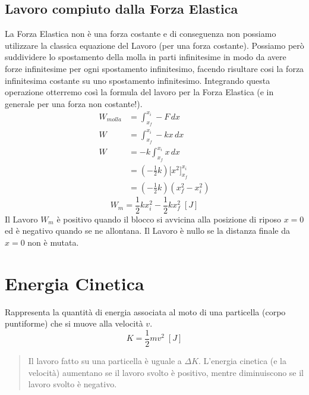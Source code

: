        \subsection{Lavoro compiuto dalla Forza Elastica} La Forza Elastica non 
        è una forza costante e di conseguenza non possiamo utilizzare la 
        classica equazione del Lavoro (per una forza costante). Possiamo però 
        suddividere lo spostamento della molla in parti infinitesime in modo da
        avere forze infinitesime per ogni spostamento infinitesimo, facendo 
        risultare cosi la forza infinitesima costante su uno spostamento 
        infinitesimo. Integrando questa operazione otterremo così la formula 
        del lavoro per la Forza Elastica 
        (e in generale per una forza non costante!).
        \begin{align*}
            W_{molla} &= \int_{x_f}^{x_i} -F \,dx \\
            W &= \int_{x_f}^{x_i} -kx \,dx \\
            W &= -k \int_{x_f}^{x_i} x \,dx \\
            &= (-\frac{1}{2}k)\bigg[x^2 \bigg]_{x_f}^{x_i} \\
            &= (-\frac{1}{2}k) (x^2_f - x^2_i)
        \end{align*}
        \begin{equation}
            W_m = \frac{1}{2}kx^2_i - \frac{1}{2}kx^2_f \;[J]
        \end{equation}
        Il Lavoro $W_m$ è positivo quando il blocco si avvicina alla posizione 
        di riposo $x=0$ ed è negativo quando se ne allontana. Il Lavoro è nullo
        se la distanza finale da $x=0$ non è mutata.

    \section{Energia Cinetica} Rappresenta la quantità di energia associata al 
        moto di una particella (corpo puntiforme) che si muove alla velocità 
        $v$.
        \begin{equation}
            K = \frac{1}{2}mv^2 \;[J]
        \end{equation}

        \begin{quote}
            Il lavoro fatto su una particella è uguale a $\Delta K$. L'energia 
            cinetica (e la velocità) aumentano se il lavoro svolto è positivo, 
            mentre diminuiscono se il lavoro svolto è negativo.
        \end{quote}

